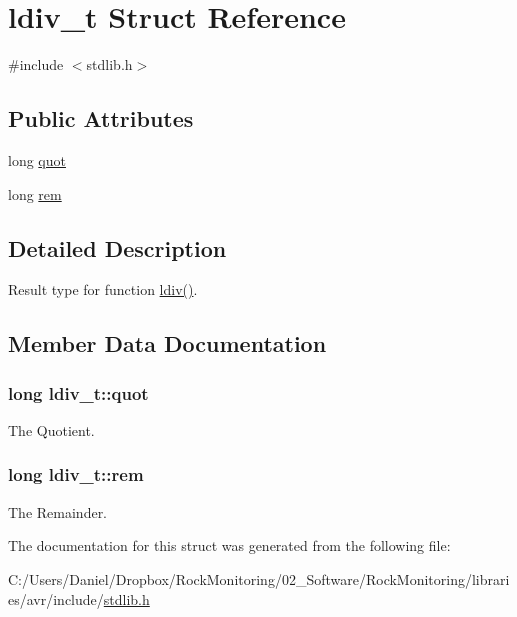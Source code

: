 \hypertarget{structldiv__t}{}\section{ldiv\+\_\+t Struct Reference}
\label{structldiv__t}


{\ttfamily \#include $<$stdlib.\+h$>$}

\subsection*{Public Attributes}
\begin{DoxyCompactItemize}
\item 
long \hyperlink{structldiv__t_a73efd59c176304c327cb4214d0e5e5c9}{quot}
\item 
long \hyperlink{structldiv__t_a0f217ff62b8640aa945ec84d6d0bd000}{rem}
\end{DoxyCompactItemize}


\subsection{Detailed Description}
Result type for function \hyperlink{group__avr__stdlib_ga51399546cb1492103d553abf43ff6bd6}{ldiv()}. 

\subsection{Member Data Documentation}
\subsubsection[{\texorpdfstring{quot}{quot}}]{\setlength{\rightskip}{0pt plus 5cm}long ldiv\+\_\+t\+::quot}\hypertarget{structldiv__t_a73efd59c176304c327cb4214d0e5e5c9}{}\label{structldiv__t_a73efd59c176304c327cb4214d0e5e5c9}
The Quotient. 
\subsubsection[{\texorpdfstring{rem}{rem}}]{\setlength{\rightskip}{0pt plus 5cm}long ldiv\+\_\+t\+::rem}\hypertarget{structldiv__t_a0f217ff62b8640aa945ec84d6d0bd000}{}\label{structldiv__t_a0f217ff62b8640aa945ec84d6d0bd000}
The Remainder. 

The documentation for this struct was generated from the following file\+:\begin{DoxyCompactItemize}
\item 
C\+:/\+Users/\+Daniel/\+Dropbox/\+Rock\+Monitoring/02\+\_\+\+Software/\+Rock\+Monitoring/libraries/avr/include/\hyperlink{stdlib_8h}{stdlib.\+h}\end{DoxyCompactItemize}
